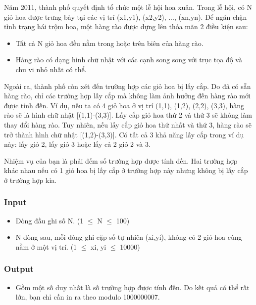 



   Năm 2011, thành phố quyết định tổ chức một lễ hội hoa xuân. Trong lễ hội, có N giỏ hoa được trưng bày tại các vị trí (x1,y1), (x2,y2), ..., (xn,yn). Để ngăn chặn tình trạng hái trộm hoa, một hàng rào được dựng lên thỏa mãn 2 điều kiện sau:  
\begin{itemize}
	\item     Tất cả N giỏ hoa đều nằm trong hoặc trên biên của hàng rào.   
\end{itemize}
\begin{itemize}
	\item     Hàng rào có dạng hình chữ nhật với các cạnh song song với trục tọa độ và chu vi nhỏ nhất có thể.   
\end{itemize}




   Ngoài ra, thành phố còn xét đến trường hợp các giỏ hoa bị lấy cắp. Do đã có sẵn hàng rào, chỉ các trường hợp lấy cắp mà không làm ảnh hưởng đến hàng rào mới được tính đến. Ví dụ, nếu ta có 4 giỏ hoa ở vị trí (1,1), (1,2), (2,2), (3,3), hàng rào sẽ là hình chữ nhật [(1,1)-(3,3)]. Lấy cắp giỏ hoa thứ 2 và thứ 3 sẽ không làm thay đổi hàng rào. Tuy nhiên, nếu lấy cắp giỏ hoa thứ nhất và thứ 3, hàng rào sẽ trở thành hình chữ nhật [(1,2)-(3,3)]. Có tất cả 3 khả năng lấy cắp trong ví dụ này: lấy giỏ 2, lấy giỏ 3 hoặc lấy cả 2 giỏ 2 và 3.   





   Nhiệm vụ của bạn là phải đếm số trường hợp được tính đến. Hai trường hợp khác nhau nếu có 1 giỏ hoa bị lấy cắp ở trường hợp này nhưng không bị lấy cắp ở trường hợp kia.  

\subsubsection{   Input  }
\begin{itemize}
	\item     Dòng đầu ghi số N. (1  $\le$  N  $\le$  100)   
\end{itemize}
\begin{itemize}
	\item     N dòng sau, mỗi dòng ghi cặp số tự nhiên (xi,yi), không có 2 giỏ hoa cùng nằm ở một vị trí. (1  $\le$  xi, yi  $\le$  10000)   
\end{itemize}

\subsubsection{   Output  }
\begin{itemize}
	\item     Gồm một số duy nhất là số trường hợp được tính đến. Do kết quả có thể rất lớn, bạn chỉ cần in ra theo modulo 1000000007.   
\end{itemize}

